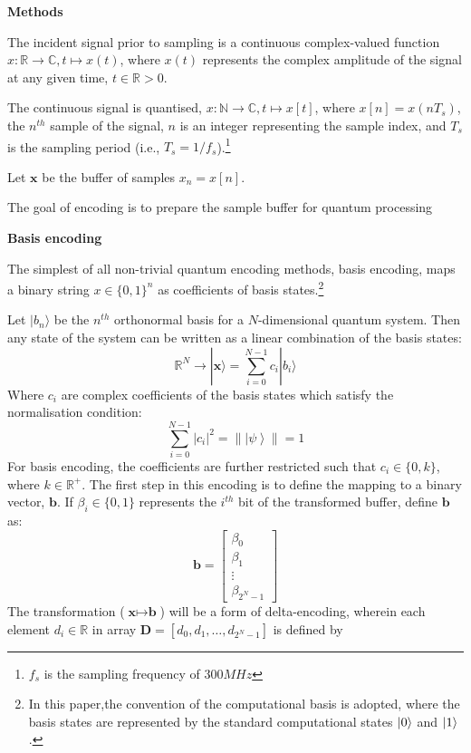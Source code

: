 \textbf{Methods}

The incident signal prior to sampling is a continuous complex-valued function
$x : \mathbb{R} \rightarrow \mathbb{C}, t \mapsto x(t)$,
where $x(t)$ represents the complex amplitude of the signal at any given time, $t \in \mathbb{R} > 0$.

The continuous signal is quantised,
$x : \mathbb{N} \rightarrow \mathbb{C}, t \mapsto x[t]$,
where $x[n] = x(n T_s)$, the $n^{th}$ sample of the signal, $n$ is an integer representing the sample index, and $T_s$ is the sampling period (i.e., $T_s = 1/f_s$).\footnote{$f_s$ is the sampling frequency of $300MHz$}

Let $\mathbf{x}$ be the buffer of samples $x_n=x[n]$.

The goal of encoding is to prepare the sample buffer for quantum processing

\textbf{Basis encoding}

The simplest of all non-trivial quantum encoding methods, basis encoding, maps a binary string $x \in {\{0,1\}}^n$ as coefficients of basis states.\footnote{In this paper,the convention of the computational basis is adopted, where the basis states are represented by the standard computational states $\left\vert{0}\right\rangle$ and $\left\vert{1}\right\rangle$.}

Let $\vert b_n \rangle$ be the $n^{th}$ orthonormal basis for a $N$-dimensional quantum system.
Then any state of the system can be written as a linear combination of the basis states:
\begin{equation}
    \displaystyle{
        \mathbb{R}^N \rightarrow | \mathbf{x} \rangle =
        \sum_{i=0}^{N-1}
            c_i | b_i \rangle
    }
\end{equation}
Where $c_i$ are complex coefficients of the basis states which satisfy the normalisation condition:
\begin{equation}
\label{eqn:normalisation_constraint}
    \displaystyle{\sum_{i=0}^{N-1} |c_i|^2 = \left\| \left|\psi\right\rangle \right\| = 1}
\end{equation}
% 
For basis encoding, the coefficients are further restricted such that $c_i \in \{0, k\}$, where $k \in \mathbb{R}^+$.
% 
The first step in this encoding is to define the mapping to a binary vector, $\textbf{b}$. If $\beta_i \in \{0, 1\}$ represents the $i^{th}$ bit of the transformed buffer, define $\textbf{b}$ as:
\begin{equation}
    \displaystyle{\mathbf{b} = \begin{bmatrix} \beta_0 \\ \beta_1 \\ \vdots \\ \beta_{2^{N}-1} \end{bmatrix}}
\end{equation}
% 
% 
The transformation ($\textbf{x} \mapsto \textbf{b}$) will be a form of delta-encoding, wherein each element $d_i \in \mathbb{R}$ in array $\mathbf{D} = [d_0, d_1, \ldots, d_{2^N-1}]$ is defined by

